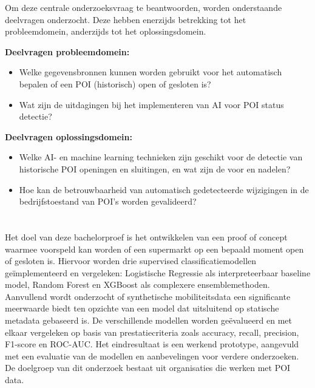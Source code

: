 Om deze centrale onderzoeksvraag te beantwoorden, worden onderstaande deelvragen onderzocht. Deze hebben enerzijds betrekking tot het probleemdomein, anderzijds tot het oplossingsdomein.

\textbf{Deelvragen probleemdomein:}
\begin{itemize}
    \item Welke gegevensbronnen kunnen worden gebruikt voor het automatisch bepalen of een POI (historisch) open of gesloten is?
    \item Wat zijn de uitdagingen bij het implementeren van AI voor POI status detectie?
\end{itemize}


\textbf{Deelvragen oplossingsdomein:}
\begin{itemize}
    \item Welke AI- en machine learning technieken zijn geschikt voor de detectie van historische POI openingen en sluitingen, en wat zijn de voor en nadelen?
    \item Hoe kan de betrouwbaarheid van automatisch gedetecteerde wijzigingen in de bedrijfstoestand van POI's worden gevalideerd?
\end{itemize}


\section{}%
\label{sec:onderzoeksdoelstelling}


Het doel van deze bachelorproef is het ontwikkelen van een proof of concept waarmee voorspeld kan worden of een supermarkt op een bepaald moment open of gesloten is. Hiervoor worden drie supervised classificatiemodellen geïmplementeerd en vergeleken: Logistische Regressie als interpreteerbaar baseline model, Random Forest en XGBoost als complexere ensemblemethoden. Aanvullend wordt onderzocht of synthetische mobiliteitsdata een significante meerwaarde biedt ten opzichte van een model dat uitsluitend op statische metadata gebaseerd is. De verschillende modellen worden geëvalueerd en met elkaar vergeleken op basis van prestatiecriteria zoals accuracy, recall, precision, F1-score en ROC-AUC. Het eindresultaat is een werkend prototype, aangevuld met een evaluatie van de modellen en aanbevelingen voor verdere onderzoeken. De doelgroep van dit onderzoek bestaat uit organisaties die werken met POI data.

